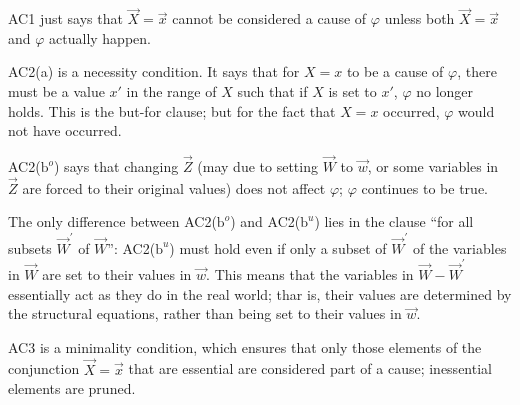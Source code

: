 \documentclass[UTF8]{ctexbook}
\begin{document}
AC1 just says that $\vec{X}=\vec{x}$ cannot be considered a cause of $\varphi$ unless both $\vec{X}=\vec{x}$ and $\varphi$ actually happen.

AC2(a) is a necessity condition. It says that for $X = x$ to be a cause of $\varphi$, there must be a value $x′$ in the range of $X$ such that if $X$ is set to $x'$, $\varphi$ no longer holds. This is the but-for clause; but for the fact that $X=x$ occurred, $\varphi$ would not have occurred.

AC2($\mathrm{b}^{o}$) says that changing $\vec{Z}$ (may due to setting $\vec{W}$ to $\vec{w}$, or some variables in $\vec{Z}$ are forced to their original values) does not affect $\varphi$; $\varphi$ continues to be true.

The only difference between AC2($\mathrm{b}^{o}$) and AC2($\mathrm{b}^{u}$) lies in the clause ``for all subsets $\vec{W}^{\prime}$ of $\vec{W}$'': AC2($\mathrm{b}^{u}$) must hold even if only a subset of $\vec{W}^{\prime}$ of the variables in $\vec{W}$ are set to their values in $\vec{w}$. This means that the variables in $\vec{W}-\vec{W}^{\prime}$ essentially act as they do in the real world; thar is, their values are determined by the structural equations, rather than being set to their values in $\vec{w}$.

AC3 is a minimality condition, which ensures that only those elements of the conjunction $\vec{X}=\vec{x}$ that are essential are considered part of a cause; inessential elements are pruned.
\end{document}

